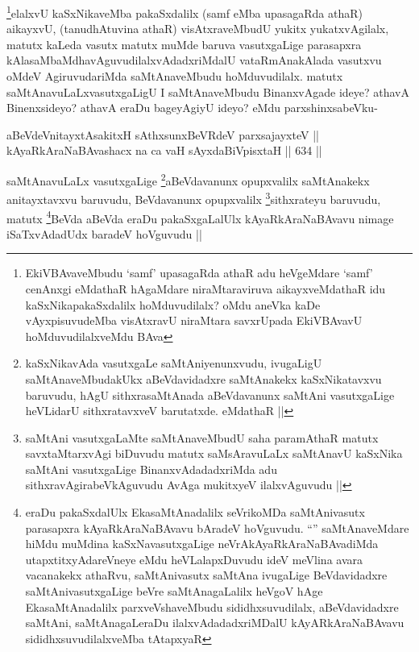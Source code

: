 \begin{artha}
\footnote{EkiVBAvaveMbudu `samf' upasagaRda athaR adu heVgeMdare `samf' cenAnxgi eMdathaR hAgaMdare niraMtaraviruva aikayxveMdathaR idu kaSxNikapakaSxdalilx hoMduvudilalx? oMdu aneVka kaDe vAyxpisuvudeMba visAtxravU niraMtara savxrUpada EkiVBAvavU hoMduvudilalxveMdu BAva}elalxvU kaSxNikaveMba pakaSxdalilx (samf eMba upasagaRda athaR) aikayxvU, (tanudhAtuvina athaR) visAtxraveMbudU yukitx yukatxvAgilalx, matutx kaLeda vasutx matutx muMde baruva vasutxgaLige parasapxra kAlasaMbaMdhavAguvudilalxvAdadxriMdalU vataRmAnakAlada vasutxvu oMdeV AgiruvudariMda saMtAnaveMbudu hoMduvudilalx. matutx saMtAnavuLaLxvasutxgaLigU I saMtAnaveMbudu BinanxvAgade ideye? athavA Binenxsideyo? athavA eraDu bageyAgiyU ideyo? eMdu parxshinxsabeVku-
\end{artha}


\begin{shl}
aBeVdeV\s nitayxtAsakitxH sAthxsunxBeVRdeV parxsajayxteV ||  \\
kAyaRkAraNaBAvashacx na ca vaH sAyxdaBiVpisxtaH \hfill||  634 ||  
\end{shl}

\begin{artha}
saMtAnavuLaLx vasutxgaLige \footnote{kaSxNikavAda vasutxgaLe saMtAniyenunxvudu, ivugaLigU saMtAnaveMbudakUkx aBeVdavidadxre saMtAnakekx kaSxNikatavxvu baruvudu, hAgU sithxrasaMtAnada aBeVdavanunx saMtAni vasutxgaLige heVLidarU sithxratavxveV barutatxde. eMdathaR ||}aBeVdavanunx opupxvalilx saMtAnakekx anitayxtavxvu baruvudu, BeVdavanunx opupxvalilx \footnote{saMtAni vasutxgaLaMte saMtAnaveMbudU saha paramAthaR matutx savxtaMtarxvAgi biDuvudu matutx saMsAravuLaLx saMtAnavU kaSxNika saMtAni vasutxgaLige BinanxvAdadadxriMda adu sithxravAgirabeVkAguvudu AvAga mukitxyeV ilalxvAguvudu ||}sithxrateyu baruvudu, matutx \footnote{eraDu pakaSxdalUlx EkasaMtAnadalilx seVrikoMDa saMtAnivasutx parasapxra kAyaRkAraNaBAvavu bAradeV hoVguvudu. ``\stext'' saMtAnaveMdare hiMdu muMdina kaSxNavasutxgaLige neVrAkAyaRkAraNaBAvadiMda utapxtitxyAdareVneye eMdu heVLalapxDuvudu ideV meVlina avara vacanakekx athaRvu, saMtAnivasutx saMtAna ivugaLige BeVdavidadxre saMtAnivasutxgaLige beVre saMtAnagaLalilx heVgoV hAge EkasaMtAnadalilx parxveVshaveMbudu sididhxsuvudilalx, aBeVdavidadxre saMtAni, saMtAnagaLeraDu ilalxvAdadadxriMDalU kAyARkAraNaBAvavu sididhxsuvudilalxveMba tAtapxyaR}BeVda aBeVda eraDu pakaSxgaLalUlx kAyaRkAraNaBAvavu nimage iSaTxvAdadUdx baradeV hoVguvudu ||
\end{artha}

